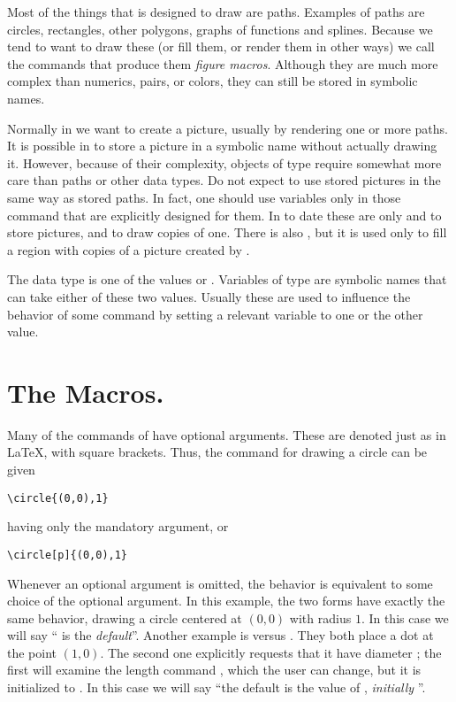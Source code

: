 \documentclass[letterpaper]{article}
\begin{document}
Most of the things that \mfp{} is designed to draw are paths. Examples
of paths are circles, rectangles,  other polygons, graphs of
functions and splines. Because we tend to want to draw these (or fill
them, or render them in other ways) we call the \mfp{} commands that
produce them \emph{figure macros}. Although they are much more complex
than numerics, pairs, or colors, they can still be stored in symbolic
names.

Normally in \mfp{} we want to create a picture, usually by rendering one
or more paths. It is possible in \MF{} to store a picture in a symbolic
name without actually drawing it. However, because of their complexity,
objects of type  require somewhat more care than paths or
other data types. Do not expect to use stored pictures in the same way
as stored paths. In fact, one should use  variables only in
those command that are explicitly designed for them. In \mfp{} to date
these are only  and  to store
pictures, and  to draw copies of one. There is also
, but it is used only to fill a region with copies of a picture
created by .

The  data type is one of the values  or
. Variables of type  are symbolic names that can
take either of these two values. Usually these are used to influence the
behavior of some command by setting a relevant  variable to
one or the other value.


\clearpage
\chapter{The Macros.}\label{macros}

Many of the commands of \mfp{} have optional arguments. These are
denoted just as in \LaTeX{}, with square brackets. Thus, the command for
drawing a circle can be given
\begin{verbatim}
\circle{(0,0),1}
\end{verbatim}
having only the mandatory argument, or
\begin{verbatim}
\circle[p]{(0,0),1}
\end{verbatim}
Whenever an optional argument is omitted, the behavior is equivalent to
some choice of the optional argument. In this example, the two forms
have exactly the same behavior, drawing a circle centered at $(0,0)$
with radius $1$. In this case we will say `` is the
\emph{default}''. Another example is  versus
\oarg{3pt}. They both place a dot at the point
$(1,0)$. The second one explicitly requests that it have diameter
\dim{3pt}; the first will examine the length command ,
which the user can change, but it is initialized to \dim{2pt}. In this
case we will say ``the default is the value of ,
\emph{initially} \dim{2pt}''.
\end{document}
